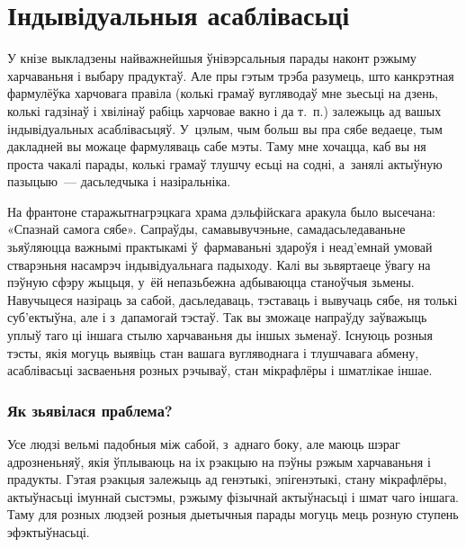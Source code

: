 \chapter{Індывідуальныя асаблівасьці}

У кнізе выкладзены найважнейшыя ўнівэрсальныя парады наконт рэжыму харчаваньня і выбару прадуктаў. Але пры гэтым трэба разумець, што канкрэтная фармулёўка харчовага правіла (колькі грамаў вугляводаў мне зьесьці на дзень, колькі гадзінаў і хвілінаў рабіць харчовае вакно і да т.~п.) залежыць ад вашых індывідуальных асаблівасьцяў. У~цэлым, чым больш вы пра сябе ведаеце, тым дакладней вы можаце фармуляваць сабе мэты. Таму мне хочацца, каб вы ня проста чакалі парады, колькі грамаў тлушчу есьці на содні, а~занялі актыўную пазыцыю~--- дасьледчыка і назіральніка.


На франтоне старажытнагрэцкага храма дэльфійскага аракула было высечана: «Спазнай самога сябе». Сапраўды, самавывучэньне, самадасьледаваньне зьяўляюцца важнымі практыкамі ў~фармаваньні здароўя і неад'емнай умовай стварэньня насамрэч індывідуальнага падыходу. Калі вы зьвяртаеце ўвагу на пэўную сфэру жыцьця, у~ёй непазьбежна адбываюцца станоўчыя зьмены. Навучыцеся назіраць за сабой, дасьледаваць, тэставаць і вывучаць сябе, ня толькі суб'ектыўна, але і з~дапамогай тэстаў. Так вы зможаце напраўду заўважыць уплыў таго ці іншага стылю харчаваньня ды іншых зьменаў. Існуюць розныя тэсты, якія могуць выявіць стан вашага вугляводнага і тлушчавага абмену, асаблівасьці засваеньня розных рэчываў, стан мікрафлёры і шматлікае іншае.

\subsection{Як зьявілася праблема?}

Усе людзі вельмі падобныя між сабой, з~аднаго боку, але маюць шэраг адрозненьняў, якія ўплываюць на іх рэакцыю на пэўны рэжым харчаваньня і прадукты. Гэтая рэакцыя залежыць ад генэтыкі, эпігенэтыкі, стану мікрафлёры, актыўнасьці імуннай сыстэмы, рэжыму фізычнай актыўнасьці і шмат чаго іншага. Таму для розных людзей розныя дыетычныя парады могуць мець розную ступень эфэктыўнасьці.

